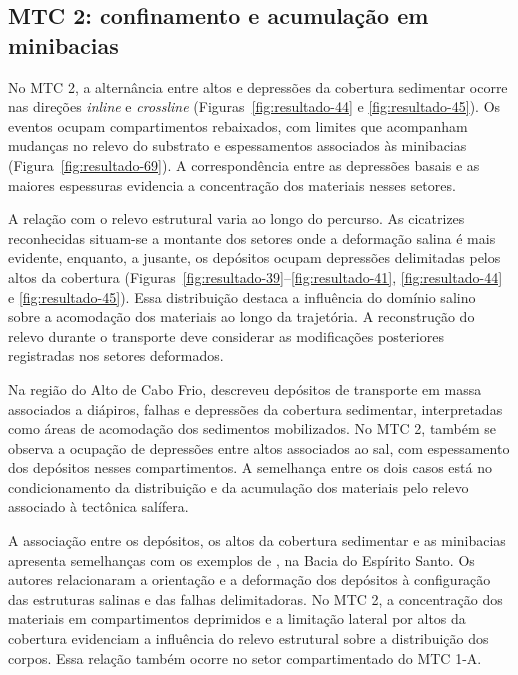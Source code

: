 \subsection{MTC 2: confinamento e acumulação em minibacias}\label{sec:6-2-3}

No MTC 2, a alternância entre altos e depressões da cobertura sedimentar ocorre nas direções\textit{ inline} e\textit{ crossline} (Figuras~\ref{fig:resultado-44} e \ref{fig:resultado-45}). Os eventos ocupam compartimentos rebaixados, com limites que acompanham mudanças no relevo do substrato e espessamentos associados às minibacias (Figura~\ref{fig:resultado-69}). A correspondência entre as depressões basais e as maiores espessuras evidencia a concentração dos materiais nesses setores.

A relação com o relevo estrutural varia ao longo do percurso. As cicatrizes reconhecidas situam-se a montante dos setores onde a deformação salina é mais evidente, enquanto, a jusante, os depósitos ocupam depressões delimitadas pelos altos da cobertura (Figuras~\ref{fig:resultado-39}--\ref{fig:resultado-41}, \ref{fig:resultado-44} e \ref{fig:resultado-45}). Essa distribuição destaca a influência do domínio salino sobre a acomodação dos materiais ao longo da trajetória. A reconstrução do relevo durante o transporte deve considerar as modificações posteriores registradas nos setores deformados.

Na região do Alto de Cabo Frio,  descreveu depósitos de transporte em massa associados a diápiros, falhas e depressões da cobertura sedimentar, interpretadas como áreas de acomodação dos sedimentos mobilizados. No MTC 2, também se observa a ocupação de depressões entre altos associados ao sal, com espessamento dos depósitos nesses compartimentos. A semelhança entre os dois casos está no condicionamento da distribuição e da acumulação dos materiais pelo relevo associado à tectônica salífera.

A associação entre os depósitos, os altos da cobertura sedimentar e as minibacias apresenta semelhanças com os exemplos de , na Bacia do Espírito Santo. Os autores relacionaram a orientação e a deformação dos depósitos à configuração das estruturas salinas e das falhas delimitadoras. No MTC 2, a concentração dos materiais em compartimentos deprimidos e a limitação lateral por altos da cobertura evidenciam a influência do relevo estrutural sobre a distribuição dos corpos. Essa relação também ocorre no setor compartimentado do MTC 1-A.


